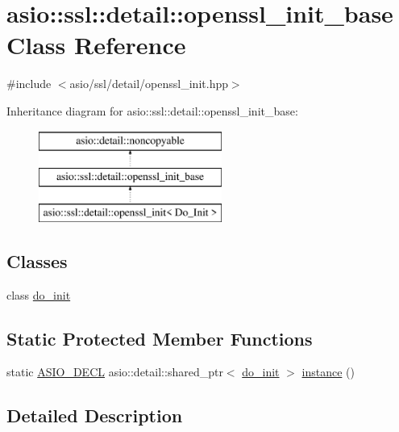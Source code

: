 \hypertarget{classasio_1_1ssl_1_1detail_1_1openssl__init__base}{}\section{asio\+:\+:ssl\+:\+:detail\+:\+:openssl\+\_\+init\+\_\+base Class Reference}
\label{classasio_1_1ssl_1_1detail_1_1openssl__init__base}


{\ttfamily \#include $<$asio/ssl/detail/openssl\+\_\+init.\+hpp$>$}

Inheritance diagram for asio\+:\+:ssl\+:\+:detail\+:\+:openssl\+\_\+init\+\_\+base\+:\begin{figure}[H]
\begin{center}
\leavevmode
\includegraphics[height=3.000000cm]{classasio_1_1ssl_1_1detail_1_1openssl__init__base}
\end{center}
\end{figure}
\subsection*{Classes}
\begin{DoxyCompactItemize}
\item 
class \hyperlink{classasio_1_1ssl_1_1detail_1_1openssl__init__base_1_1do__init}{do\+\_\+init}
\end{DoxyCompactItemize}
\subsection*{Static Protected Member Functions}
\begin{DoxyCompactItemize}
\item 
static \hyperlink{config_8hpp_ab54d01ea04afeb9a8b39cfac467656b7}{A\+S\+I\+O\+\_\+\+D\+E\+C\+L} asio\+::detail\+::shared\+\_\+ptr$<$ \hyperlink{classasio_1_1ssl_1_1detail_1_1openssl__init__base_1_1do__init}{do\+\_\+init} $>$ \hyperlink{classasio_1_1ssl_1_1detail_1_1openssl__init__base_a8fee32acce29fa06c847a4bcc9e4512a}{instance} ()
\end{DoxyCompactItemize}


\subsection{Detailed Description}


